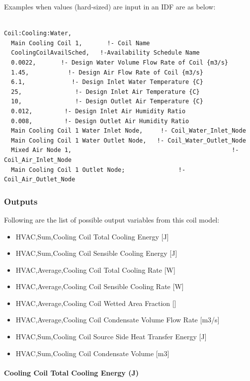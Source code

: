 Examples when values (hard-sized) are input in an IDF are as below:

\begin{lstlisting}

Coil:Cooling:Water,
  Main Cooling Coil 1,       !- Coil Name
  CoolingCoilAvailSched,   !-Availability Schedule Name
  0.0022,       !- Design Water Volume Flow Rate of Coil {m3/s}
  1.45,           !- Design Air Flow Rate of Coil {m3/s}
  6.1,             !- Design Inlet Water Temperature {C}
  25,               !- Design Inlet Air Temperature {C}
  10,               !- Design Outlet Air Temperature {C}
  0.012,         !- Design Inlet Air Humidity Ratio
  0.008,         !- Design Outlet Air Humidity Ratio
  Main Cooling Coil 1 Water Inlet Node,     !- Coil_Water_Inlet_Node
  Main Cooling Coil 1 Water Outlet Node,   !- Coil_Water_Outlet_Node
  Mixed Air Node 1,                                             !- Coil_Air_Inlet_Node
  Main Cooling Coil 1 Outlet Node;               !- Coil_Air_Outlet_Node
\end{lstlisting}

\subsubsection{Outputs}\label{outputs-015}

Following are the list of possible output variables from this coil model:

\begin{itemize}
\item
  HVAC,Sum,Cooling Coil Total Cooling Energy {[}J{]}
\item
  HVAC,Sum,Cooling Coil Sensible Cooling Energy {[}J{]}
\item
  HVAC,Average,Cooling Coil Total Cooling Rate {[}W{]}
\item
  HVAC,Average,Cooling Coil Sensible Cooling Rate {[}W{]}
\item
  HVAC,Average,Cooling Coil Wetted Area Fraction {[]}
\item
  HVAC,Average,Cooling Coil Condensate Volume Flow Rate {[}m3/s{]}
\item
  HVAC,Sum,Cooling Coil Source Side Heat Transfer Energy {[}J{]}
\item
  HVAC,Sum,Cooling Coil Condensate Volume {[}m3{]}
\end{itemize}

\paragraph{Cooling Coil Total Cooling Energy (J)}\label{cooling-coil-total-cooling-energy-j}

